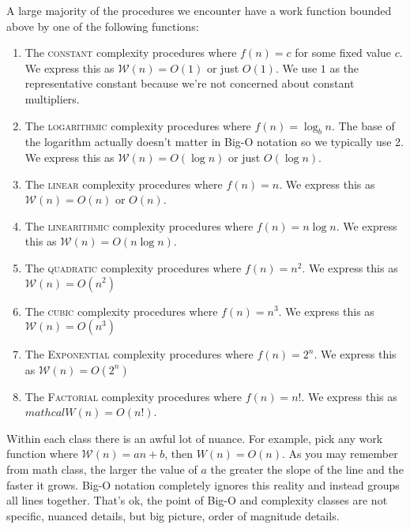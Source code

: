 \documentclass[]{tufte-handout}
\begin{document}
A large majority of the procedures we encounter have a work function bounded above by one of the following functions:
\begin{enumerate}
\item The \textsc{constant} complexity procedures where $f(n) = c$ for some fixed value $c$. We express this as $\mathcal{W}(n) = O(1)$ or just $O(1)$. We use $1$ as the representative constant because we're not concerned about constant multipliers. 

\item The \textsc{logarithmic} complexity procedures where $f(n) = \log_b n$. The base of the logarithm actually doesn't matter in Big-O notation so we typically use 2. We express this as $\mathcal{W}(n) = O(\log n)$ or just $O(\log n)$.

\item The \textsc{linear} complexity procedures where $f(n) = n$. We express this as $\mathcal{W}(n) = O(n)$ or $O(n)$.

\item The \textsc{linearithmic} complexity procedures where $f(n) = n\log n$. We express this as $\mathcal{W}(n) = O(n \log n)$. 

\item The \textsc{quadratic} complexity procedures where $f(n) = n^2$. We express this as $\mathcal{W}(n) = O(n^2)$

\item The \textsc{cubic} complexity procedures where $f(n) = n^3$. We express this as  $\mathcal{W}(n) = O(n^3)$

\item The \textsc{Exponential} complexity procedures where $f(n) = 2^n$. We express this as  $\mathcal{W}(n) = O(2^n)$

\item The \textsc{Factorial} complexity procedures where $f(n) = n!$. We express this as $mathcal{W}(n) = O(n!)$.
\end{enumerate}

Within each class there is an awful lot of nuance. For example, pick any work function where $\mathcal{W}(n)= an + b$, then $W(n) = O(n)$. As you may remember from math class, the larger the value of $a$ the greater the slope of the line and the faster it grows. Big-O notation completely ignores this reality and instead groups all lines together. That's ok, the point of Big-O and complexity classes are not specific, nuanced details, but big picture, order of magnitude details.
\end{document}
